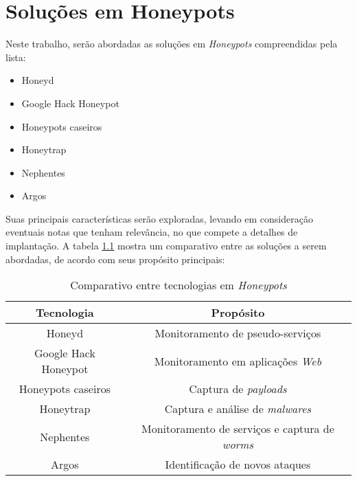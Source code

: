 \chapter{Soluções em Honeypots}\label{capitulo:solucoes}

Neste trabalho, serão abordadas as soluções em \textit{Honeypots} compreendidas pela lista:

\begin{itemize}
    \item Honeyd
    \item Google Hack Honeypot
    \item Honeypots caseiros
    \item Honeytrap
    \item Nephentes
    \item Argos
\end{itemize}

Suas principais características serão exploradas, levando em consideração eventuais notas que tenham relevância, no que compete a detalhes de implantação. A tabela \ref{tabela:comparativo_honeypots} mostra um comparativo entre as soluções a serem abordadas, de acordo com seus propósito principais:

\begin{table}[h]
    \begin{center}
        \caption{\label{tabela:comparativo_honeypots}Comparativo entre tecnologias em \textit{Honeypots}}
        \begin{tabular}{c|c}
            \hline
            \hline
                \textbf{Tecnologia} & \textbf{Propósito}\\
            \hline
                Honeyd & Monitoramento de pseudo-serviços\\
            \hline
                Google Hack Honeypot & Monitoramento em aplicações \textit{Web}\\
            \hline
                Honeypots caseiros & Captura de \textit{payloads}\\
            \hline
                Honeytrap & Captura e análise de \textit{malwares}\\
            \hline
                Nephentes & Monitoramento de serviços e captura de \textit{worms}\\
            \hline
                Argos & Identificação de novos ataques\\
            \hline
            \hline
        \end{tabular}
    \end{center}
\end{table}

